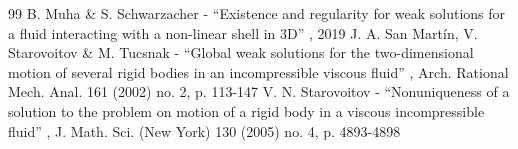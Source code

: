 \begin{thebibliography}{99}
 B. Muha \& S. Schwarzacher - “Existence and regularity for weak solutions for a fluid interacting with a non-linear shell in 3D” , 2019
 J. A. San Martín, V. Starovoitov \& M. Tucsnak - “Global weak solutions for the two-dimensional motion of several rigid bodies in an incompressible viscous fluid” , Arch. Rational Mech. Anal. 161 (2002) no. 2, p. 113-147
 V. N. Starovoitov - “Nonuniqueness of a solution to the problem on motion of a rigid body in a viscous incompressible fluid” , J. Math. Sci. (New York) 130 (2005) no. 4, p. 4893-4898
\end{thebibliography}
